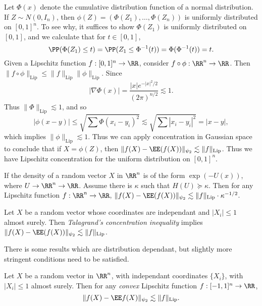 \begin{example}
    Let $\Phi(x)$ denote the cumulative distribution function of a normal distribution. If $Z \sim N(0,I_n)$, then $\phi(Z) = (\Phi(Z_1), \dots, \Phi(Z_n))$ is uniformly distributed on $[0,1]^n$. To see why, it suffices to show $\Phi(Z_1)$ is uniformly distributed on $[0,1]$, and we calculate that for $t \in [0,1]$,
    \[ \PP(\Phi(Z_1) \leq t) = \PP(Z_1 \leq \Phi^{-1}(t)) = \Phi(\Phi^{-1}(t)) = t. \]
    Given a Lipschitz function $f: [0,1]^n \to \RR$, consider $f \circ \phi: \RR^n \to \RR$. Then $\| f \circ \phi \|_{\text{Lip}} \leq \| f \|_{\text{Lip}} \| \phi \|_{\text{Lip}}$. Since
    \[ | \nabla \Phi(x)| = \frac{|x| e^{-|x|^2/2}}{(2\pi)^{n/2}} \lesssim 1. \]
    Thus $\| \Phi \|_{\text{Lip}} \lesssim 1$, and so
    \[ |\phi(x-y)| \leq \sqrt{ \sum \Phi(x_i - y_i)^2 } \lesssim \sqrt{ \sum |x_i - y_i|^2 } = |x - y|, \]
    which implies $\| \phi \|_{\text{Lip}} \lesssim 1$. Thus we can apply concentration in Gaussian space to conclude that if $X = \phi(Z)$, then $\| f(X) - \EE(f(X)) \|_{\psi_2} \lesssim \| f \|_{\text{Lip}}$. Thus we have Lipschitz concentration for the uniform distribution on $[0,1]^n$.
\end{example}

\begin{example}
    If the density of a random vector $X$ in $\RR^n$ is of the form $\exp(-U(x))$, where $U \to \RR^n \to \RR$. Assume there is $\kappa$ such that $H(U) \succeq \kappa$. Then for any Lipschitz function $f: \RR^n \to \RR$, $\| f(X) - \EE(f(X)) \|_{\psi_2} \lesssim \| f \|_{\text{Lip}} \cdot \kappa^{-1/2}$.
\end{example}

\begin{example}
    Let $X$ be a random vector whose coordinates are independant and $|X_i| \leq 1$ almost surely. Then \emph{Talagrand's concentration inequality} implies $\| f(X) - \EE(f(X)) \|_{\psi_2} \lesssim \| f \|_{\text{Lip}}$.
\end{example}

There is some results which are distribution dependant, but slightly more stringent conditions need to be satisfied.

\begin{theorem}
	Let $X$ be a random vector in $\RR^n$, with independant coordinates $\{ X_i \}$, with $|X_i| \leq 1$ almost surely. Then for any {\it convex} Lipschitz function $f: [-1,1]^n \to \RR$,
	\[ \| f(X) - \EE f(X) \|_{\psi_2} \lesssim \| f \|_{\text{Lip}}. \]
\end{theorem}

